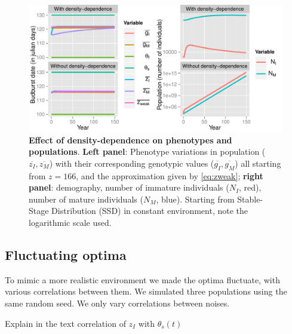 \begin{figure}[ht!]
	\centering
	\includegraphics[scale=1]{Figures/DDphenopop.pdf}
	\caption{\textbf{Effect of density-dependence on phenotypes and populations}. \textbf{Left panel}: Phenotype variations in population ($\overline{z_I}, \overline{z_M}$) with their corresponding genotypic values ($\overline{g_I}, \overline{g_M}$) all starting from $z = 166$, and the approximation given by \autoref{eq:zweak}; \textbf{right panel}: demography, number of immature individuals ($N_I$, red), number of mature individuals ($N_M$, blue). Starting from Stable-Stage Distribution (SSD) in constant environment, note the logarithmic scale used.}
	\label{fig:dd}
\end{figure}

\subsection*{Fluctuating optima}

To mimic a more realistic environment we made the optima fluctuate, with various correlations between them. We simulated three populations using the same random seed. We only vary correlations between noises.

Explain in the text correlation of $z_{I}$ with $\theta_{s}(t)$

